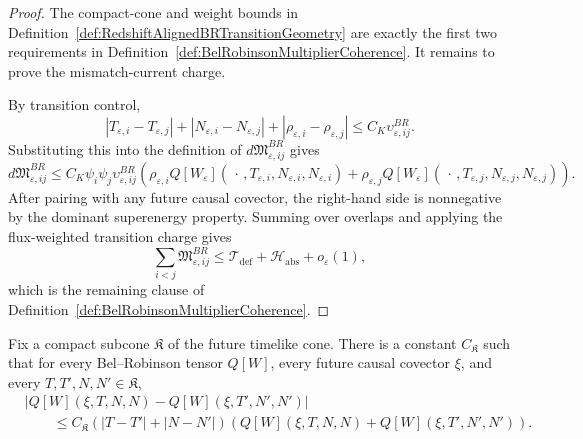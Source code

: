 \begin{proof}
The compact-cone and weight bounds in Definition~\ref{def:RedshiftAlignedBRTransitionGeometry} are exactly the first two requirements in Definition~\ref{def:BelRobinsonMultiplierCoherence}. It remains to prove the mismatch-current charge.

By transition control,
\[
    |T_{\varepsilon,i}-T_{\varepsilon,j}|
    +
    |N_{\varepsilon,i}-N_{\varepsilon,j}|
    +
    |\rho_{\varepsilon,i}-\rho_{\varepsilon,j}|
    \le
    C_K\upsilon^{BR}_{\varepsilon,ij}.
\]
Substituting this into the definition of $d\mathfrak M^{BR}_{\varepsilon,ij}$ gives
\[
    d\mathfrak M^{BR}_{\varepsilon,ij}
    \le
    C_K\psi_i\psi_j\upsilon^{BR}_{\varepsilon,ij}
    \left(
        \rho_{\varepsilon,i}Q[W_\varepsilon](\,\cdot\,,T_{\varepsilon,i},N_{\varepsilon,i},N_{\varepsilon,i})
        +
        \rho_{\varepsilon,j}Q[W_\varepsilon](\,\cdot\,,T_{\varepsilon,j},N_{\varepsilon,j},N_{\varepsilon,j})
    \right).
\]
After pairing with any future causal covector, the right-hand side is nonnegative by the dominant superenergy property. Summing over overlaps and applying the flux-weighted transition charge gives
\[
    \sum_{i<j}\mathfrak M^{BR}_{\varepsilon,ij}
    \le
    \mathcal T_{\mathrm{def}}+\mathcal H_{\mathrm{abs}}+o_\varepsilon(1),
\]
which is the remaining clause of Definition~\ref{def:BelRobinsonMultiplierCoherence}.
\end{proof}

\begin{lemma}\label{lem:BelRobinsonCausalPolarizationBound}
Fix a compact subcone $\mathfrak K$ of the future timelike cone. There is a constant $C_{\mathfrak K}$ such that for every Bel--Robinson tensor $Q[W]$, every future causal covector $\xi$, and every $T,T',N,N'\in\mathfrak K$,
\[
\begin{split}
    &\left|
    Q[W](\xi,T,N,N)-Q[W](\xi,T',N',N')
    \right| \\
    &\qquad\le
    C_{\mathfrak K}
    \left(|T-T'|+|N-N'|\right)
    \left(
        Q[W](\xi,T,N,N)+Q[W](\xi,T',N',N')
    \right).
\end{split}
\]
\end{lemma}

